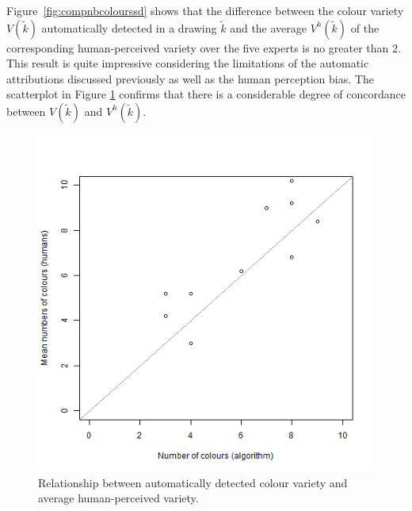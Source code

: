\documentclass[11pt,a4paper]{article}
\begin{document}
Figure~\ref{fig:compnbcolourssd} shows that the difference between the colour variety $V(\tilde{k})$ automatically detected in a drawing $\tilde{k}$ and the average $V^h(\tilde{k})$ of the corresponding human-perceived variety over the five experts is no greater than 2. This result is quite impressive considering the limitations of the automatic attributions discussed previously as well as the human perception bias. The scatterplot in Figure \ref{fig:compnbcoloursscatter} confirms that there is a considerable degree of concordance between $V(\tilde{k})$ and $V^h(\tilde{k})$.

\begin{figure}[h!]
	\centering
	\includegraphics[width=\linewidth]{figures/comp_nb_colours_scatter.png}
	\caption{Relationship between automatically detected colour variety and average human-perceived variety.}
	\label{fig:compnbcoloursscatter}
\end{figure}
\end{document}
